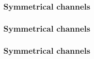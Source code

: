 \documentclass[14pt]{beamer}
\begin{document}
\begin{frame}
\frametitle{Symmetrical channels}
\begin{itemize}

\end{itemize}
\end{frame}




\begin{frame}
\frametitle{Symmetrical channels}
\begin{itemize}

\end{itemize}
\end{frame}



\begin{frame}
\frametitle{Symmetrical channels}
\begin{itemize}

\end{itemize}
\end{frame}






\end{document}
